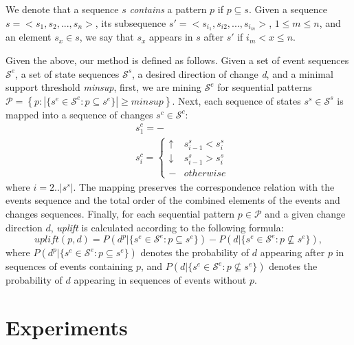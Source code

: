 \documentclass[runningheads,a4paper]{llncs}
\begin{document}
We denote that a sequence $s$ \textit{contains} a pattern $p$ if $p\subseteq s$.
Given a sequence $s=<s_1,s_2,...,s_n>$, its subsequence $s'=<s_{i_1}, s_{i2}, ..., s_{i_m}>$, $1\leq m\leq n$, and an element $s_x\in s$, we say that $s_x$ appears in $s$ after $s'$ if $i_m<x\leq n$.

Given the above, our method is defined as follows.
Given a set of event sequences $\mathcal{S}^e$, a set of state sequences $\mathcal{S}^s$, a desired direction of change \textit{d}, and a minimal support threshold \textit{minsup}, first, we are mining $\mathcal{S}^e$ for sequential patterns $\mathcal{P}=\left\{p:|\{s^e\in\mathcal{S}^e:p\subseteq s^e\}|\geq\textit{minsup}\right\}$.
Next, each sequence of states $s^s\in\mathcal{S}^s$ is mapped into a sequence of changes $s^c\in\mathcal{S}^c$:
\begin{equation*}
\begin{split}
&s^c_1=-\\
&s^c_i=\begin{cases}
	\uparrow & s^s_{i-1}<s^s_i \\
	\downarrow & s^s_{i-1}>s^s_i \\
	- & otherwise
\end{cases}
\end{split}
\end{equation*}
where $i=2..|s^s|$.
The mapping preserves the correspondence relation with the events sequence and the total order of the combined elements of the events and changes sequences.
Finally, for each sequential pattern $p\in\mathcal{P}$ and a given change direction $d$, \textit{uplift} is calculated according to the following formula:
\begin{equation*}
\textit{uplift}(p,d)=P(d^p|\{s^e\in\mathcal{S}^e:p\subseteq s^e\})-P(d|\{s^e\in\mathcal{S}^e:p\not\subseteq s^e\}),
\end{equation*}
where $P(d^p|\{s^e\in\mathcal{S}^e:p\subseteq s^e\})$ denotes the probability of $d$ appearing after $p$ in sequences of events containing $p$, and $P(d|\{s^e\in\mathcal{S}^e:p\not\subseteq s^e\})$ denotes the probability of $d$ appearing in sequences of events without $p$.

\section{Experiments}
\label{sec:experiments}
\end{document}

